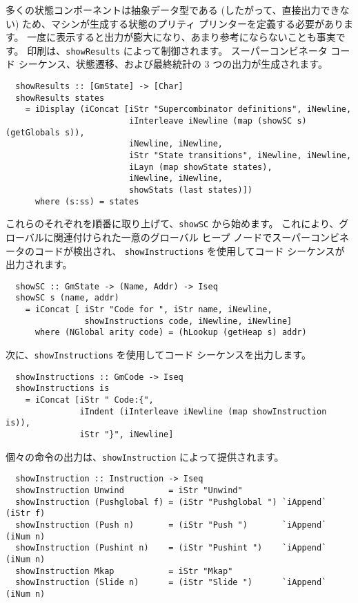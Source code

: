 \documentclass{jarticle}
\begin{document}
多くの状態コンポーネントは抽象データ型である (したがって、直接出力できない) ため、マシンが生成する状態のプリティ プリンターを定義する必要があります。
一度に表示すると出力が膨大になり、あまり参考にならないことも事実です。
印刷は、\texttt{showResults} によって制御されます。
スーパーコンビネータ コード シーケンス、状態遷移、および最終統計の 3 つの出力が生成されます。

\begin{verbatim}
  showResults :: [GmState] -> [Char]
  showResults states
    = iDisplay (iConcat [iStr "Supercombinator definitions", iNewline,
                         iInterleave iNewline (map (showSC s) (getGlobals s)),
                         iNewline, iNewline,
                         iStr "State transitions", iNewline, iNewline,
                         iLayn (map showState states),
                         iNewline, iNewline,
                         showStats (last states)])
      where (s:ss) = states
\end{verbatim}

これらのそれぞれを順番に取り上げて、\texttt{showSC} から始めます。
これにより、グローバルに関連付けられた一意のグローバル ヒープ ノードでスーパーコンビネータのコードが検出され、
\texttt{showInstructions} を使用してコード シーケンスが出力されます。

\begin{verbatim}
  showSC :: GmState -> (Name, Addr) -> Iseq
  showSC s (name, addr)
    = iConcat [ iStr "Code for ", iStr name, iNewline,
                showInstructions code, iNewline, iNewline]
      where (NGlobal arity code) = (hLookup (getHeap s) addr)
\end{verbatim}

次に、\texttt{showInstructions} を使用してコード シーケンスを出力します。

\begin{verbatim}
  showInstructions :: GmCode -> Iseq
  showInstructions is
    = iConcat [iStr " Code:{",
               iIndent (iInterleave iNewline (map showInstruction is)),
               iStr "}", iNewline]
\end{verbatim}

個々の命令の出力は、\texttt{showInstruction} によって提供されます。

\begin{verbatim}
  showInstruction :: Instruction -> Iseq
  showInstruction Unwind         = iStr "Unwind"
  showInstruction (Pushglobal f) = (iStr "Pushglobal ") `iAppend` (iStr f)
  showInstruction (Push n)       = (iStr "Push ")       `iAppend` (iNum n)
  showInstruction (Pushint n)    = (iStr "Pushint ")    `iAppend` (iNum n)
  showInstruction Mkap           = iStr "Mkap"
  showInstruction (Slide n)      = (iStr "Slide ")      `iAppend` (iNum n)
\end{verbatim}
\end{document}
